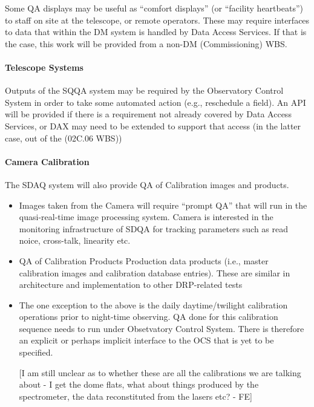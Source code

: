 Some QA displays may be useful as ``comfort displays'' (or ``facility heartbeats'') to staff on site at the telescope, or remote operators.  These may require interfaces to data that within the DM system is handled by Data Access Services.  If that is the case, this work will be provided from a non-DM (Commissioning) WBS.

\paragraph{Telescope Systems}
\label{sec:qaTelescopeSystem}

Outputs of the SQQA system may be required by the Observatory Control
System in order to take some automated action (e.g., reschedule a
field). An API will be provided if there is a requirement not already
covered by Data Access Services, or DAX may need to be extended to support that access (in the latter case, out of the (02C.06 WBS))

\paragraph{Camera Calibration}
\label{sec:qaCameraCalibration}

The SDAQ system will also provide QA of Calibration images and products.

\begin{itemize}

\item Images taken from the Camera will require ``prompt QA'' that will run in the quasi-real-time image processing system. Camera is interested in the monitoring infrastructure of SDQA for tracking parameters such as read noice, cross-talk, linearity etc.

\item QA of Calibration Products Production data products (i.e., master calibration images and calibration database entries). These are similar in architecture and implementation to other DRP-related tests

\item The one exception to the above is the daily daytime/twilight calibration operations prior to night-time observing. QA done for this calibration sequence needs to run under Obsetvatory Control System. There is therefore an explicit or perhaps implicit interface to the OCS that is yet to be specified.

[I am still unclear as to whether these are all the calibrations we are talking about - I get the dome flats, what about things produced by the spectrometer, the data reconstituted from the lasers etc? - FE]

\end{itemize}

